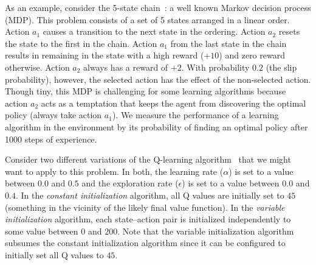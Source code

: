 As an example, consider the 5-state chain~\cite{strens2000bayesian}: a well known Markov decision process (MDP).
This problem consists of a set of 5 states arranged in a linear order. Action $a_1$ causes a transition to the next state in the ordering. Action $a_2$ resets the state to the first in the chain. Action $a_1$ from the last state in the chain results in remaining in the state with a high reward ($+10$) and zero reward otherwise. Action $a_2$ always has a reward of $+2$. %
With probability $0.2$ (the slip probability), however, the selected action has the effect of the non-selected action. Though tiny, this MDP is challenging for some learning algorithms because action $a_2$ acts as a temptation that keeps the agent from discovering the optimal policy (always take action $a_1$). We measure the performance of a learning algorithm in the environment by its probability of finding an optimal policy after 1000 steps of experience. 

Consider two different variations of the Q-learning algorithm~\cite{sutton1998reinforcement} that we might want to apply to this problem. In both, the learning rate ($\alpha$) is set to a value between $0.0$ and $0.5$ and the exploration rate ($\epsilon$) is set to a value between $0.0$ and $0.4$.
In the \emph{constant initialization} algorithm, all Q values are initially set to %
$45$ (something in the vicinity of the likely final value function).
In the \emph{variable initialization} algorithm, each state--action pair is initialized independently to some value between $0$ and $200$. Note that the variable initialization algorithm subsumes the constant initialization algorithm since it can be configured to initially set all Q values to 
$45$.


